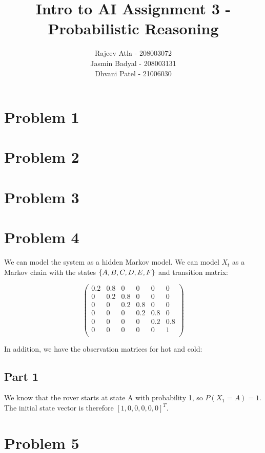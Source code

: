 \documentclass[12pt]{article}
\begin{document}
\title{Intro to AI Assignment 3 - Probabilistic Reasoning}
\author{Rajeev Atla - 208003072\\ 
Jasmin Badyal - 208003131\\
Dhvani Patel - 21006030}
\maketitle

\section{Problem 1}

\section{Problem 2}

\section{Problem 3}

\section{Problem 4}

We can model the system as a hidden Markov model.
We can model $X_t$ as a Markov chain with the states $\left \{ A, B, C, D, E, F \right \}$ and transition matrix:

$$
\begin{pmatrix}
0.2 & 0.8 & 0 & 0 & 0 & 0 \\
0 & 0.2 & 0.8 & 0 & 0 & 0 \\
0 & 0 & 0.2 & 0.8 & 0 & 0 \\
0 & 0 & 0 & 0.2 & 0.8 & 0 \\
0 & 0 & 0 & 0 & 0.2 & 0.8 \\
0 & 0 & 0 & 0 & 0 & 1 \\
\end{pmatrix}
$$

In addition,
we have the observation matrices for hot and cold:

\subsection{Part 1}

We know that the rover starts at state A with probability 1,
so $P(X_1 = A) = 1$.
The initial state vector is therefore $[1, 0, 0, 0, 0, 0]^T$.




\section{Problem 5}
\end{document}
